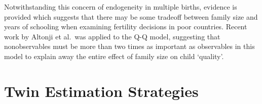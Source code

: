 \documentclass{article}[11pt,subeqn]
\begin{document}
\begin{spacing}{1.5}
Notwithstanding this concern of endogeneity in multiple births, evidence is provided which suggests that there may be some tradeoff between family size and years of schooling when examining fertility decisions in poor countries.  Recent work by Altonji et al.\ was applied to the Q-Q model, suggesting that nonobservables must be more than two times as important as observables in this model to explain away the entire effect of family size on child `quality'.


\newpage


\newpage
\appendix
\section{Twin Estimation Strategies}
\label{scn:litrev}

\vspace{19.2cm}	


\end{spacing}
\end{document}
